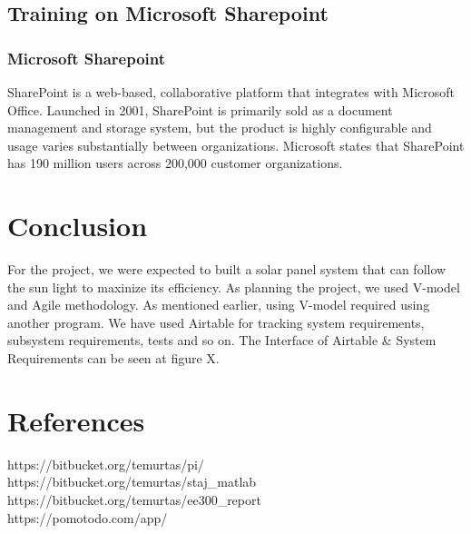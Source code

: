 \subsection{Training on Microsoft Sharepoint}


\subsubsection{Microsoft Sharepoint}
\-

SharePoint is a web-based, collaborative platform that integrates with Microsoft Office. Launched in 2001, SharePoint is primarily sold as a document management and storage system, but the product is highly configurable and usage varies substantially between organizations.
Microsoft states that SharePoint has 190 million users across 200,000 customer organizations.


\section{Conclusion}

\-
\indent For the project, we were expected to built a solar panel system that can follow the sun light to maxinize its efficiency. As planning the project, we used V-model and Agile methodology. As mentioned earlier, using V-model required using another program. We have used Airtable for tracking system requirements, subsystem requirements, tests and so on. The Interface of Airtable \& System Requirements can be seen at figure X. 
\-



\section{References }

https://bitbucket.org/temurtas/pi/
\\
https://bitbucket.org/temurtas/staj\_matlab
\\
https://bitbucket.org/temurtas/ee300\_report
\\
https://pomotodo.com/app/
\-



